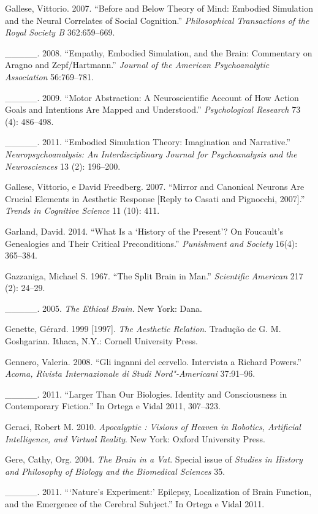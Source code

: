 {\begin{Parskip}
Gallese, Vittorio. 2007. ``Before and Below Theory of Mind: Embodied
Simulation and the Neural Correlates of Social Cognition.''
\emph{Philosophical Transactions of the Royal Society B} 362:659--669.

\_\_\_\_\_. 2008. ``Empathy, Embodied Simulation, and the Brain:
Commentary on Aragno and Zepf/Hartmann.'' \emph{Journal of the American
Psychoanalytic Association} 56:769--781.

\_\_\_\_\_. 2009. ``Motor Abstraction: A Neuroscientific Account of How
Action Goals and Intentions Are Mapped and Understood.''
\emph{Psychological Research} 73 (4): 486--498.

\_\_\_\_\_. 2011. ``Embodied Simulation Theory: Imagination and
Narrative.'' \emph{Neuropsychoanalysis: An Interdisciplinary Journal for
Psychoanalysis and the Neurosciences} 13 (2): 196--200.

Gallese, Vittorio, e David Freedberg. 2007. ``Mirror and Canonical
Neurons Are Crucial Elements in Aesthetic Response {[}Reply to Casati
and Pignocchi, 2007{]}.'' \emph{Trends in Cognitive Science} 11 (10):
411.

Garland, David. 2014. ``What Is a `History of the Present'? On
Foucault's Genealogies and Their Critical Preconditions.''
\emph{Punishment and Society} 16(4): 365--384.

Gazzaniga, Michael S. 1967. ``The Split Brain in Man.'' \emph{Scientific
American} 217 (2): 24--29.

\_\_\_\_\_. 2005. \emph{The Ethical Brain}. New York: Dana.

Genette, Gérard. 1999 {[}1997{]}. \emph{The Aesthetic Relation}.
Tradução de G. M. Goshgarian. Ithaca, N.Y.: Cornell University Press.

Gennero, Valeria. 2008. ``Gli inganni del cervello. Intervista a Richard
Powers.'' \emph{Acoma, Rivista Internazionale di Studi Nord"-Americani}
37:91--96.

\_\_\_\_\_. 2011. ``Larger Than Our Biologies. Identity and Consciousness
in Contemporary Fiction.'' In Ortega e Vidal 2011, 307--323.

Geraci, Robert M. 2010. \emph{Apocalyptic : Visions of Heaven in
Robotics, Artificial Intelligence, and Virtual Reality}. New York:
Oxford University Press.

Gere, Cathy, Org. 2004. \emph{The Brain in a Vat}. Special issue of
\emph{Studies in History and Philosophy of Biology and the Biomedical
Sciences} 35.

\_\_\_\_\_. 2011. ```Nature's Experiment:' Epilepsy, Localization of
Brain Function, and the Emergence of the Cerebral Subject.'' In Ortega e
Vidal 2011.


\end{Parskip}}

